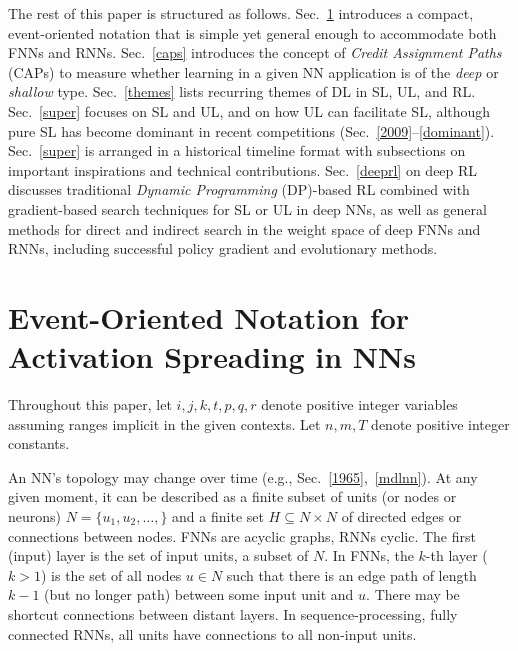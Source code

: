 \documentclass[letterpaper]{article}
\begin{document}
The rest of this paper is
structured as follows.
Sec.~\ref{notation} introduces
a compact, event-oriented notation that is simple yet general enough to accommodate both
FNNs and RNNs. 
Sec.~\ref{caps} introduces the concept of {\em Credit Assignment Paths} (CAPs) to measure whether learning in a given  NN application is of the {\em deep} or {\em shallow} type.
Sec.~\ref{themes} lists recurring themes of DL in SL, UL, and RL. 
Sec.~\ref{super}  focuses on SL and UL, 
and on how UL can facilitate SL, although pure SL
has become dominant in recent competitions  
(Sec.~\ref{2009}--\ref{dominant}).
Sec.~\ref{super} is arranged in a
historical timeline format with 
subsections on
important inspirations and technical contributions.
Sec.~\ref{deeprl} on deep RL discusses traditional
{\em Dynamic Programming} (DP)-based RL 
combined with gradient-based search techniques for SL or UL in deep NNs, 
as well as general methods for direct and indirect search in the weight space of deep 
FNNs and RNNs, 
including successful policy gradient and evolutionary methods.

 




\section{Event-Oriented Notation for Activation Spreading in NNs}
\label{notation}

Throughout this paper, let $i,j,k,t,p,q,r$ denote positive integer variables
assuming ranges implicit in the given contexts. 
Let $n,m,T$ denote positive integer constants.

An NN's topology may change over time (e.g., Sec.~\ref{1965},~\ref{mdlnn}).
At any given moment, 
it can be described as a finite subset of units (or nodes or neurons)  $N=\{u_1,u_2, \ldots, \}$ and a finite set 
$H \subseteq N \times N$ of directed edges or connections between nodes.
FNNs are acyclic graphs, RNNs cyclic. 
The first (input) layer is the set of input units, a subset of $N$.
In FNNs, the $k$-th layer ($k>1$) is the set of all nodes 
$u \in N$ such that there is an edge path of length $k-1$ (but no longer path) between some input unit and $u$.
There may be shortcut connections between distant layers.
In sequence-processing, fully connected 
 RNNs, all units have connections to all non-input units.

\end{document}
